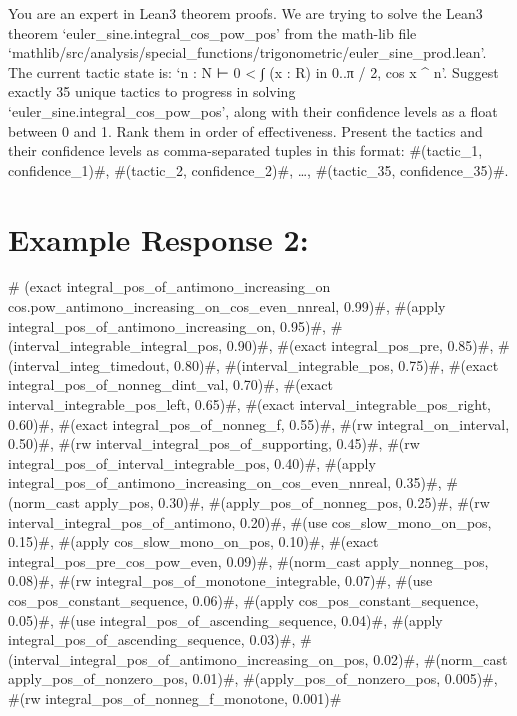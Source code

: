 \documentclass[
]{article}
\begin{document}
You are an expert in Lean3 theorem proofs. We are trying to solve the
Lean3 theorem `euler\_sine.integral\_cos\_pow\_pos' from the math-lib
file
`mathlib/src/analysis/special\_functions/trigonometric/euler\_sine\_prod.lean'.
The current tactic state is: `n : N ⊢ 0 \textless{} ∫ (x : R) in 0..π /
2, cos x \^{} n'. Suggest exactly 35 unique tactics to progress in
solving `euler\_sine.integral\_cos\_pow\_pos', along with their
confidence levels as a float between 0 and 1. Rank them in order of
effectiveness. Present the tactics and their confidence levels as
comma-separated tuples in this format: \#(tactic\_1, confidence\_1)\#,
\#(tactic\_2, confidence\_2)\#, \ldots, \#(tactic\_35,
confidence\_35)\#.

\section{Example Response 2:}\label{example-response-2}

\# (exact integral\_pos\_of\_antimono\_increasing\_on
cos.pow\_antimono\_increasing\_on\_cos\_even\_nnreal, 0.99)\#, \#(apply
integral\_pos\_of\_antimono\_increasing\_on, 0.95)\#,
\#(interval\_integrable\_integral\_pos, 0.90)\#, \#(exact
integral\_pos\_pre, 0.85)\#, \#(interval\_integ\_timedout, 0.80)\#,
\#(interval\_integrable\_pos, 0.75)\#, \#(exact
integral\_pos\_of\_nonneg\_dint\_val, 0.70)\#, \#(exact
interval\_integrable\_pos\_left, 0.65)\#, \#(exact
interval\_integrable\_pos\_right, 0.60)\#, \#(exact
integral\_pos\_of\_nonneg\_f, 0.55)\#, \#(rw integral\_on\_interval,
0.50)\#, \#(rw interval\_integral\_pos\_of\_supporting, 0.45)\#, \#(rw
integral\_pos\_of\_interval\_integrable\_pos, 0.40)\#, \#(apply
integral\_pos\_of\_antimono\_increasing\_on\_cos\_even\_nnreal, 0.35)\#,
\#(norm\_cast apply\_pos, 0.30)\#, \#(apply\_pos\_of\_nonneg\_pos,
0.25)\#, \#(rw interval\_integral\_pos\_of\_antimono, 0.20)\#, \#(use
cos\_slow\_mono\_on\_pos, 0.15)\#, \#(apply cos\_slow\_mono\_on\_pos,
0.10)\#, \#(exact integral\_pos\_pre\_cos\_pow\_even, 0.09)\#,
\#(norm\_cast apply\_nonneg\_pos, 0.08)\#, \#(rw
integral\_pos\_of\_monotone\_integrable, 0.07)\#, \#(use
cos\_pos\_constant\_sequence, 0.06)\#, \#(apply
cos\_pos\_constant\_sequence, 0.05)\#, \#(use
integral\_pos\_of\_ascending\_sequence, 0.04)\#, \#(apply
integral\_pos\_of\_ascending\_sequence, 0.03)\#,
\#(interval\_integral\_pos\_of\_antimono\_increasing\_on\_pos, 0.02)\#,
\#(norm\_cast apply\_pos\_of\_nonzero\_pos, 0.01)\#,
\#(apply\_pos\_of\_nonzero\_pos, 0.005)\#, \#(rw
integral\_pos\_of\_nonneg\_f\_monotone, 0.001)\#
\end{document}
